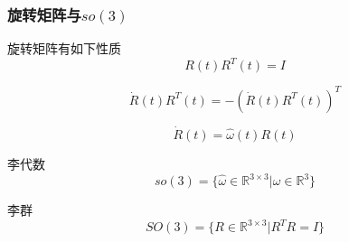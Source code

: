 \documentclass{ctexart}
\begin{document}
	\subsubsection{旋转矩阵与$so(3)$}
	旋转矩阵有如下性质
	\begin{equation}
	R(t) R^T(t) = I
	\end{equation}
	
	\begin{equation}
	\dot{R}(t) R^T(t) = -(\dot{R}(t) R^T(t))^T
	\end{equation}
	
	\begin{equation}
	\dot{R}(t) = \hat{\omega}(t) R(t)
	\end{equation}
	
	李代数
	\begin{equation}
	so(3) = \{ \hat{\omega} \in \mathbb{R}^{3\times 3} | \omega \in \mathbb{R}^3 \}
	\end{equation}
	
	李群
	\begin{equation}
	SO(3) = \{ R \in \mathbb{R}^{3\times 3} | R^T R = I \}
	\end{equation}
	
	
	
	
\end{document}
